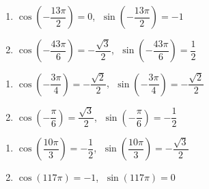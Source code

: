 \documentclass{ximera}
\begin{document}
\begin{multicols}{2}

\begin{enumerate}

\setcounter{enumi}{\value{HW}}

\item $\cos \left(-\dfrac{13\pi}{2}\right) = 0$, $\; \sin \left(-\dfrac{13\pi}{2}\right) = -1$ 

\item $\cos\left(-\dfrac{43\pi}{6}\right) = -\dfrac{\sqrt{3}}{2}$, $\; \sin\left(-\dfrac{43\pi}{6}\right) = \dfrac{1}{2}$

\setcounter{HW}{\value{enumi}}

\end{enumerate}

\end{multicols}

\begin{multicols}{2}

\begin{enumerate}

\setcounter{enumi}{\value{HW}}

\item $\cos \left(-\dfrac{3\pi}{4} \right) = -\dfrac{\sqrt{2}}{2}$, $\; \sin \left(-\dfrac{3\pi}{4} \right) = -\dfrac{\sqrt{2}}{2}$

\item $\cos\left(-\dfrac{\pi}{6}\right) = \dfrac{\sqrt{3}}{2}$, $\; \sin\left(-\dfrac{\pi}{6}\right) = -\dfrac{1}{2}$

\setcounter{HW}{\value{enumi}}

\end{enumerate}

\end{multicols}

\begin{multicols}{2}

\begin{enumerate}

\setcounter{enumi}{\value{HW}}

\item $\cos\left(\dfrac{10\pi}{3}\right) = -\dfrac{1}{2}$, $\; \sin \left(\dfrac{10\pi}{3}\right) = -\dfrac{\sqrt{3}}{2}$

\item $\cos(117\pi) = -1$, $\; \sin(117\pi) = 0$ 

\setcounter{HW}{\value{enumi}}

\end{enumerate}

\end{multicols}
\end{document}
